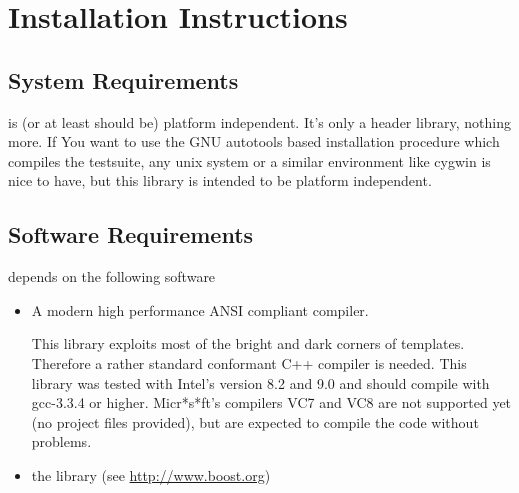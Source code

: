 

\section{Installation Instructions}
\label{sec: Installation Instructions}


\subsection{System Requirements}
\label{sec: System Requirements}

\Daixtrose is (or at least should be) platform independent. It's only a \CC
header library, nothing more.
If You want to use the GNU autotools based installation procedure which
compiles the testsuite, any unix system or a similar environment like cygwin is
nice to have, but this library is intended to be platform independent.

\subsection{Software Requirements}
\label{sec: Software Requirements}

\Daixtrose depends on the following software
%

\begin{itemize}
\setlength{\itemsep}{5pt minus 5pt}
\setlength{\parsep}{0pt}
\setlength{\parskip}{0pt}


\item A modern high performance ANSI compliant \CC compiler.  
  
  This library exploits most of the bright and dark corners of \CC templates.
  Therefore a rather standard conformant C++ compiler is needed.  This library
  was tested with Intel's \CC version 8.2 and 9.0 and should compile with
  gcc-3.3.4 or higher. Micr*s*ft's compilers VC7 and VC8 are not supported yet
  (no project files provided), but are expected to compile the code without
  problems.


\item the  
library (see \url{http://www.boost.org})
\end{itemize}



